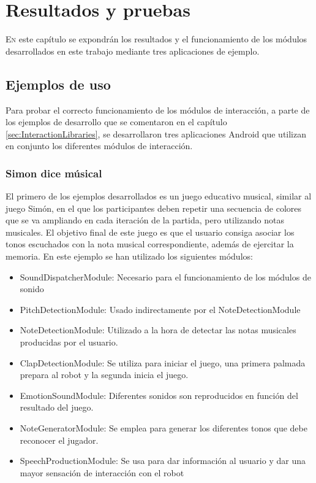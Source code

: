 \chapter{Resultados y pruebas}
\label{chap:results}
\vspace{0.5cm}


 
\lettrine{E}{n} este capítulo se expondrán los resultados y el funcionamiento de los módulos desarrollados en este trabajo mediante tres aplicaciones de ejemplo.
\section{Ejemplos de uso}
Para probar el correcto funcionamiento de los módulos de interacción, a parte de los ejemplos de desarrollo que se comentaron en el capítulo \ref{sec:InteractionLibraries}, se desarrollaron tres aplicaciones Android que utilizan en conjunto los diferentes módulos de interacción.

\subsection{Simon dice músical}
\label{subsec:simon-musical}
El primero de los ejemplos desarrollados es un juego educativo musical, similar al juego Simón, en el que los participantes deben repetir una secuencia de colores que se va ampliando en cada iteración de la partida, pero utilizando notas musicales. El objetivo final de este juego es que el usuario consiga asociar los tonos escuchados con la nota musical correspondiente, además de ejercitar la memoria.
En este ejemplo se han utilizado los siguientes módulos:

\begin{itemize}
	\item SoundDispatcherModule: Necesario para el funcionamiento de los módulos de sonido
	\item PitchDetectionModule: Usado indirectamente por el NoteDetectionModule
	\item NoteDetectionModule: Utilizado a la hora de detectar las notas musicales producidas por el usuario.
	\item ClapDetectionModule: Se utiliza para iniciar el juego, una primera palmada prepara al robot y la segunda inicia el juego.
	\item EmotionSoundModule: Diferentes sonidos son reproducidos en función del resultado del juego.
	\item NoteGeneratorModule: Se emplea para generar los diferentes tonos que debe reconocer el jugador.
	\item SpeechProductionModule: Se usa para dar información al usuario y dar una mayor sensación de interacción con el robot
\end{itemize}

